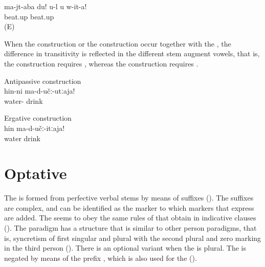 \begin{exe}
	\ex	\label{ex:‎Do not thrash me}
	\gll	ma-jt-aba	du!	u-l	u	w-it-a!\\
		beat.up				beat.up\\
	\glt	{} (E)
\end{exe}

When the  construction or the  construction occur together with the , the difference in transitivity is reflected in the different stem augment vowels, that is, the  construction requires  , whereas the  construction requires  .

\begin{exe}
	\ex
	\begin{xlist}
		\ex	\label{ex:Do not drink water (regularly)}
		Antipassive construction\\
		\gll	hin-ni	ma-d-učː-utːaja!\\
			water-	drink\\
		\glt	{}
	
		\ex	\label{Do not drink the water}
		Ergative construction\\
		\gll	hin	ma-d-učː-itːaja!\\
			water	drink\\
		\glt	{}
	\end{xlist}
\end{exe}



\section{Optative}
\label{sec:optative}

The  is formed from perfective verbal stems by means of suffixes (). The suffixes are complex, and  can be identified as the  marker to which markers that express  are added. The  seems to obey the same rules of  that obtain in indicative clauses (). The paradigm has a structure that is similar to other person paradigms, that is, syncretism of first singular and plural with the second plural and zero marking in the third person (). There is an optional variant  when the  is plural. The  is negated by means of the prefix , which is also used for the  ().

